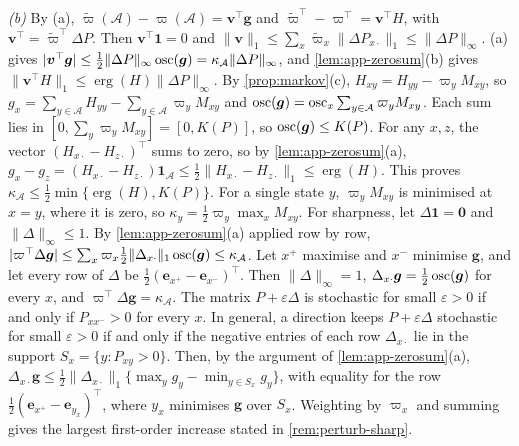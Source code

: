 \emph{(b)} By (a), $\tilde\varpi(\mathcal A)-\varpi(\mathcal A)=\bm v^{\top}\bm g$ and $\tilde\varpi^{\top}-\varpi^{\top}=\bm v^{\top}H$, with $\bm v^{\top}=\tilde\varpi^{\top}\Delta P$. Then $\bm v^{\top}\bm1=0$ and $\|\bm v\|_1\le\sum_x\tilde\varpi_x\|\Delta P_{x\cdot}\|_1\le\|\Delta P\|_\infty$. (a) gives $|\bm v^{\top}\bm g|\le\frac12\|\Delta P\|_\infty\operatorname{osc}(\bm g)=\kappa_{\mathcal A}\|\Delta P\|_\infty$, and \cref{lem:app-zerosum}(b) gives $\|\bm v^{\top}H\|_1\le\operatorname{erg}(H)\|\Delta P\|_\infty$.
By \cref{prop:markov}(c), $H_{xy}=H_{yy}-\varpi_yM_{xy}$, so $g_x=\sum_{y\in\mathcal A}H_{yy}-\sum_{y\in\mathcal A}\varpi_yM_{xy}$ and $\operatorname{osc}(\bm g)=\operatorname{osc}_x\sum_{y\in\mathcal A}\varpi_yM_{xy}$. Each sum lies in $[0,\sum_y\varpi_yM_{xy}]=[0,K(P)]$, so $\operatorname{osc}(\bm g)\le K(P)$. For any $x,z$, the vector $(H_{x\cdot}-H_{z\cdot})^{\top}$ sums to zero, so by \cref{lem:app-zerosum}(a), $g_x-g_z=(H_{x\cdot}-H_{z\cdot})\bm1_{\mathcal A}\le\frac12\|H_{x\cdot}-H_{z\cdot}\|_1\le\operatorname{erg}(H)$. This proves $\kappa_{\mathcal A}\le\frac12\min\{\operatorname{erg}(H),K(P)\}$. For a single state $y$, $\varpi_yM_{xy}$ is minimised at $x=y$, where it is zero, so $\kappa_y=\frac12\varpi_y\max_xM_{xy}$.
For sharpness, let $\Delta\bm1=\bm0$ and $\|\Delta\|_\infty\le1$. By \cref{lem:app-zerosum}(a) applied row by row, $|\varpi^{\top}\Delta\bm g|\le\sum_x\varpi_x\frac12\|\Delta_{x\cdot}\|_1\operatorname{osc}(\bm g)\le\kappa_{\mathcal A}$. Let $x^+$ maximise and $x^-$ minimise $\bm g$, and let every row of $\Delta$ be $\frac12(\bm e_{x^+}-\bm e_{x^-})^{\top}$. Then $\|\Delta\|_\infty=1$, $\Delta_{x\cdot}\bm g=\frac12\operatorname{osc}(\bm g)$ for every $x$, and $\varpi^{\top}\Delta\bm g=\kappa_{\mathcal A}$. The matrix $P+\varepsilon\Delta$ is stochastic for small $\varepsilon>0$ if and only if $P_{xx^-}>0$ for every $x$. In general, a direction keeps $P+\varepsilon\Delta$ stochastic for small $\varepsilon>0$ if and only if the negative entries of each row $\Delta_{x\cdot}$ lie in the support $S_x=\{y:P_{xy}>0\}$. Then, by the argument of \cref{lem:app-zerosum}(a), $\Delta_{x\cdot}\bm g\le\frac12\|\Delta_{x\cdot}\|_1\{\max_yg_y-\min_{y\in S_x}g_y\}$, with equality for the row $\frac12(\bm e_{x^+}-\bm e_{y_x})^{\top}$, where $y_x$ minimises $\bm g$ over $S_x$. Weighting by $\varpi_x$ and summing gives the largest first-order increase stated in \cref{rem:perturb-sharp}.

